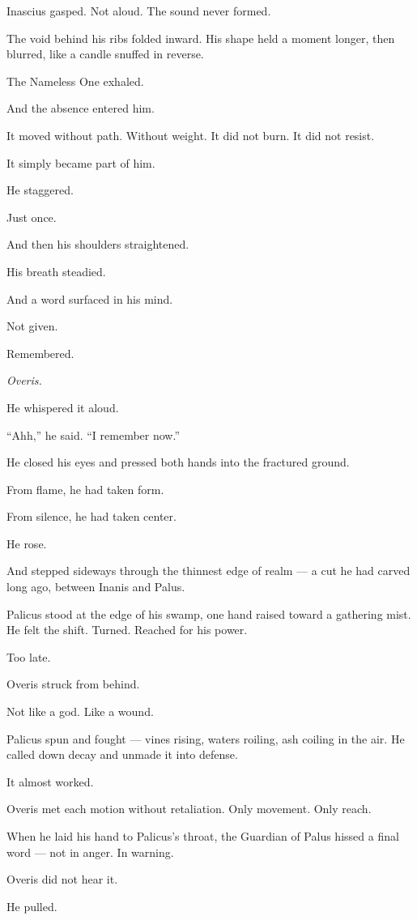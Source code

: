 \documentclass[9pt]{article}
\begin{document}
Inascius gasped. Not aloud. The sound never formed.

The void behind his ribs folded inward. His shape held a moment longer, then blurred, like a candle snuffed in reverse.

The Nameless One exhaled.

And the absence entered him.

It moved without path. Without weight. It did not burn. It did not resist.

It simply became part of him.

He staggered.

Just once.

And then his shoulders straightened.

His breath steadied.

And a word surfaced in his mind.

Not given.

Remembered.

\emph{Overis.}

He whispered it aloud.

``Ahh,'' he said. ``I remember now.''

He closed his eyes and pressed both hands into the fractured ground.

From flame, he had taken form.

From silence, he had taken center.

He rose.

And stepped sideways through the thinnest edge of realm — a cut he had carved long ago, between Inanis and Palus.

Palicus stood at the edge of his swamp, one hand raised toward a gathering mist. He felt the shift. Turned. Reached for his power.

Too late.

Overis struck from behind.

Not like a god. Like a wound.

Palicus spun and fought — vines rising, waters roiling, ash coiling in the air. He called down decay and unmade it into defense.

It almost worked.

Overis met each motion without retaliation. Only movement. Only reach.

When he laid his hand to Palicus’s throat, the Guardian of Palus hissed a final word — not in anger. In warning.

Overis did not hear it.

He pulled.
\end{document}
